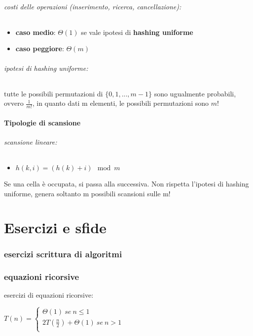 \documentclass{article}
\begin{document}
\paragraph{costi delle operazioni (inserimento, ricerca, cancellazione):}
\begin{itemize}
    \item \textbf{caso medio}: $\Theta(1)$ se vale ipotesi di \textbf{hashing uniforme}
    \item \textbf{caso peggiore}: $\Theta(m)$
\end{itemize}

\paragraph{ipotesi di hashing uniforme:} tutte le possibili permutazioni di $\{0,1,...,m-1\}$ sono ugualmente probabili, ovvero $\displaystyle \frac{1}{m!}$, in quanto dati m elementi, 
le possibili permutazioni sono $m!$

\subsection{Tipologie di scansione}

\paragraph{scansione lineare:}
\begin{itemize}
    \item $h(k,i) = (h(k) + i) \mod m$
\end{itemize}
Se una cella è occupata, si passa alla successiva. Non rispetta l'ipotesi di hashing uniforme, genera soltanto m possibili scansioni sulle m!

\part{Esercizi e sfide} %
\section{esercizi scrittura di algoritmi}
\section{equazioni ricorsive}
esercizi di equazioni ricorsive:

$T(n)= \begin{cases}
    \Theta(1) \ se \ n \leq 1\\
    2T(\frac{n}{2}) + \Theta(1) \ se \ n > 1\\
\end{cases}$
\end{document}
